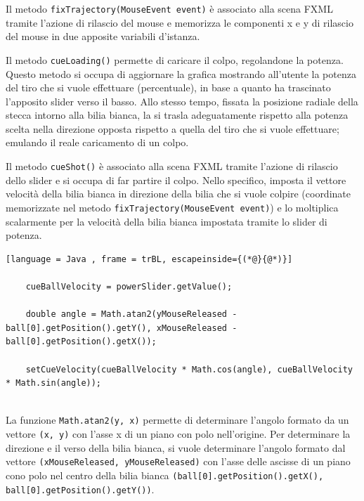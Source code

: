 \documentclass[12pt,a4paper]{report}
\begin{document}
Il metodo \texttt{fixTrajectory(MouseEvent event)} è associato alla scena FXML tramite l'azione di rilascio del mouse e memorizza le componenti x e y di rilascio del mouse in due apposite variabili d'istanza.

Il metodo \texttt{cueLoading()} permette di caricare il colpo, regolandone la potenza.
Questo metodo si occupa di aggiornare la grafica mostrando all'utente la potenza del tiro che si vuole effettuare (percentuale), in base a quanto ha trascinato l'apposito slider verso il basso.
Allo stesso tempo, fissata la posizione radiale della stecca intorno alla bilia bianca, la si trasla adeguatamente rispetto alla potenza scelta nella direzione opposta rispetto a quella del tiro che si vuole effettuare; emulando il reale caricamento di un colpo.

Il metodo \texttt{cueShot()} è associato alla scena FXML tramite l'azione di rilascio dello slider e si occupa di far partire il colpo.
Nello specifico, imposta il vettore velocità della bilia bianca in direzione della bilia che si vuole colpire (coordinate memorizzate nel metodo \texttt{fixTrajectory(MouseEvent event)}) e lo moltiplica scalarmente per la velocità della bilia bianca impostata tramite lo slider di potenza.

\vspace{5mm}

\begin{lstlisting}[language = Java , frame = trBL, escapeinside={(*@}{@*)}]

	cueBallVelocity = powerSlider.getValue();
	
    double angle = Math.atan2(yMouseReleased - ball[0].getPosition().getY(), xMouseReleased - ball[0].getPosition().getX());
    
	setCueVelocity(cueBallVelocity * Math.cos(angle), cueBallVelocity * Math.sin(angle));
	
\end{lstlisting}

\vspace{5mm}

La funzione \texttt{Math.atan2(y, x)} permette di determinare l'angolo formato da un vettore \texttt{(x, y)} con l'asse x di un piano con polo nell'origine.
Per determinare la direzione e il verso della bilia bianca, si vuole determinare l'angolo formato dal vettore \texttt{(xMouseReleased, yMouseReleased)} con l'asse delle ascisse di un piano cono polo nel centro della bilia bianca \texttt{(ball[0].getPosition().getX(), ball[0].getPosition().getY())}.
\end{document}
